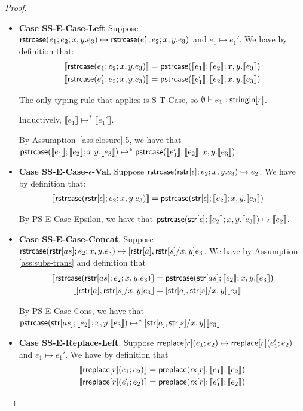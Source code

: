 \documentclass[11pt,leqno]{article}
\theoremstyle{definition}
\newcommand{\stringin}[1]{{\sf stringin}[#1]}
\renewcommand{\tstr}[1]{{{\sf str}[#1]}}
\newcommand{\treplace}[3]{{\sf preplace}(#1;#2;#3)}
\newcommand{\rx}[1]{ {\sf rx}[#1] }
\newcommand{\strcase}[3]{ {\sf rstrcase}(#1; #2; #3)}
\newcommand{\pstrcase}[3]{ {\sf pstrcase}(#1; #2; #3)}
\newcommand{\trden}[1]{\llbracket #1 \rrbracket} %
\begin{document}
\begin{proof}
\begin{itemize}[label=$ $,itemsep=1ex]
\item \textbf{Case SS-E-Case-Left}
Suppose $\strcase{e_1}{e_2}{x,y.e_3} \mapsto \strcase{e_1'}{e_2}{x,y.e_3}$ and $e_1 \mapsto e_1'$. 
We have by definition that:
\begin{align*}
  \trden{\strcase{e_1}{e_2}{x,y.e_3}} &= \pstrcase{\trden{e_1}}{\trden{e_2}}{x, y. \trden{e_3}} \\
  \trden{\strcase{e_1'}{e_2}{x,y.e_3}} &= \pstrcase{\trden{e_1'}}{\trden{e_2}}{x, y . \trden{e_3}} 
\end{align*}

The only typing rule that applies is S-T-Case, so $\emptyset \vdash e_1 : \stringin{r}$.

Inductively, $\trden{e_1} \mapsto^* \trden{e_1'}$.

By Assumption~\ref{ass:closure}.5, we have that 
$\pstrcase{\trden{e_1}}{\trden{e_2}}{x. y . \trden{e_3}} \mapsto^* \pstrcase{\trden{e_1'}}{\trden{e_2}}{x, y . \trden{e_3}}$.

\item \textbf{Case SS-E-Case-$\epsilon$-Val}.
Suppose $\strcase{\rstr{\epsilon}}{e_2}{x,y.e_3} \mapsto e_2$.
We have by definition that:
\begin{align*}
\trden{\strcase{\rstr{\epsilon}}{e_2}{x,y.e_3}} &= \pstrcase{\tstr{\epsilon}}{\trden{e_2}}{x, y. \trden{e_3}}
\end{align*}

By PS-E-Case-Epsilon, we have that
$\pstrcase{\tstr{\epsilon}}{\trden{e_2}}{x, y. \trden{e_3}} \mapsto \trden{e_2}$.

\item \textbf{Case SS-E-Case-Concat}.
Suppose $\strcase{\rstr{as}}{e_2}{x,y.e_3} \mapsto [\rstr{a},\rstr{s}/x,y]e_3$.
We have by Assumption \ref{ass:subs-trans} and definition that 
\begin{align*}
\trden{\strcase{\rstr{as}}{e_2}{x,y.e_3}} &= \pstrcase{\tstr{as}}{\trden{e_2}}{x, y.\trden{e_3}} \\
\trden{[\rstr{a},\rstr{s}/x,y]e_3} &= [\tstr{a},\tstr{s}/x,y]\trden{e_3}
\end{align*}

By PS-E-Case-Cons, we have that 
$\pstrcase{\tstr{as}}{\trden{e_2}}{x, y.\trden{e_3}} \mapsto^*
[\tstr{a},\tstr{s} / x,y]\trden{e_3}$.

\item \textbf{Case SS-E-Replace-Left}.
Suppose ${\sf rreplace}[r](e_1;e_2) \mapsto {\sf rreplace}[r](e_1';e_2)$
and $e_1 \mapsto e_1'$. We have by definition that 
\begin{align*}
\trden{\rreplace{r}{e_1}{e_2}} &= \treplace{\rx{r}}{\trden{e_1}}{\trden{e_2}} \\
\trden{\rreplace{r}{e_1'}{e_2}} &= \treplace{\rx{r}}{\trden{e_1'}}{\trden{e_2}}
\end{align*}


\end{itemize}
\end{proof}
\end{document}
